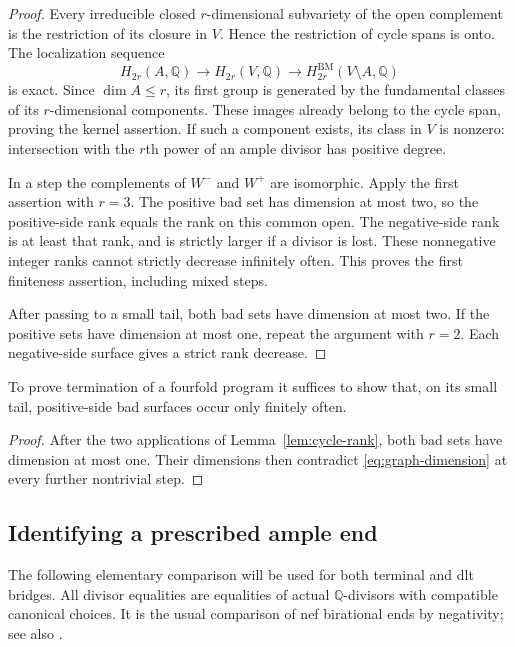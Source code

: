 \begin{proof}
Every irreducible closed $r$-dimensional subvariety of the open complement is the restriction of its closure in $V$. Hence the restriction of cycle spans is onto. The localization sequence
\[
 H_{2r}(A,\mathbb Q)\longrightarrow H_{2r}(V,\mathbb Q)
 \longrightarrow H^{\mathrm{BM}}_{2r}(V\setminus A,\mathbb Q)
\]
is exact. Since $\dim A\leq r$, its first group is generated by the fundamental classes of its $r$-dimensional components. These images already belong to the cycle span, proving the kernel assertion. If such a component exists, its class in $V$ is nonzero: intersection with the $r$th power of an ample divisor has positive degree.

In a step the complements of $W^-$ and $W^+$ are isomorphic. Apply the first assertion with $r=3$. The positive bad set has dimension at most two, so the positive-side rank equals the rank on this common open. The negative-side rank is at least that rank, and is strictly larger if a divisor is lost. These nonnegative integer ranks cannot strictly decrease infinitely often. This proves the first finiteness assertion, including mixed steps.

After passing to a small tail, both bad sets have dimension at most two. If the positive sets have dimension at most one, repeat the argument with $r=2$. Each negative-side surface gives a strict rank decrease.
\end{proof}

\begin{corollary}\label{cor:surfaces-suffice}
To prove termination of a fourfold program it suffices to show that, on its small tail, positive-side bad surfaces occur only finitely often.
\end{corollary}

\begin{proof}
After the two applications of Lemma~\ref{lem:cycle-rank}, both bad sets have dimension at most one. Their dimensions then contradict \eqref{eq:graph-dimension} at every further nontrivial step.
\end{proof}

\subsection{Identifying a prescribed ample end}

The following elementary comparison will be used for both terminal and dlt bridges. All divisor equalities are equalities of actual $\mathbb Q$-divisors with compatible canonical choices.
It is the usual comparison of nef birational ends by negativity;
see also \cite[Remark~2.7]{BirkarLC}.

